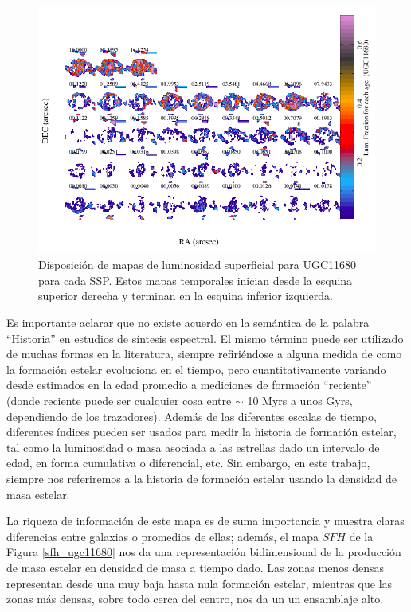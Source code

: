 \noindent
\begin{figure}
  \centering
    \includegraphics[scale=0.4]{18UGC11680_proc_elinesUGC11680_pruebas.png}
  \caption[Mapas de densidad superficial de luminosidad para UGC11680]{Disposición de mapas de luminosidad superficial para UGC11680 para cada SSP. Estos mapas temporales inician desde la esquina superior derecha y terminan en la esquina inferior izquierda.}
  \label{lum_SFH}
\end{figure}


\bigskip

\noindent Es importante aclarar que no existe acuerdo en la semántica de la palabra ``Historia'' en estudios de síntesis espectral. El mismo término puede ser utilizado de muchas formas en la literatura, siempre refiriéndose a alguna  medida de como la formación estelar evoluciona en el tiempo, pero cuantitativamente variando desde estimados en la edad promedio a mediciones de formación ``reciente'' (donde reciente puede ser cualquier cosa entre $\sim$ 10 Myrs a unos Gyrs, dependiendo de los trazadores). Además de las diferentes escalas de tiempo, diferentes índices pueden ser usados para medir la historia de formación estelar, tal como la luminosidad \citep{cid2013_1} o masa asociada a las estrellas dado un intervalo de edad, en forma cumulativa o diferencial, etc. Sin embargo, en este trabajo, siempre nos referiremos a la historia de formación estelar usando la densidad de masa estelar.

\bigskip


\noindent La riqueza de información de este mapa es de suma importancia y muestra claras diferencias entre galaxias o promedios de ellas; además, el mapa $SFH$ de la Figura \ref{sfh_ugc11680} nos da una representación bidimensional
de la producción de masa estelar en densidad de masa a tiempo dado. Las zonas menos densas representan desde una muy baja hasta nula formación estelar, mientras que las zonas más densas, sobre todo cerca del centro, nos da un un ensamblaje alto.

